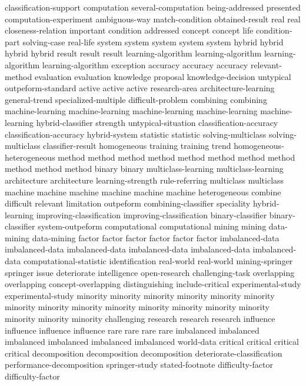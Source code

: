 classification-support	
computation	
several-computation	
being-addressed	
presented	
computation-experiment	
ambiguous-way	
match-condition	
obtained-result	
real	real	
closeness-relation	
important	
condition	
addressed	
concept	concept	
life	
condition-part	
solving-case	
real-life	
system	system	system	system	system	
hybrid	hybrid	hybrid	hybrid	
result	result	result	
learning-algorithm	learning-algorithm	learning-algorithm	learning-algorithm	
exception	
accuracy	accuracy	accuracy	
relevant-method	
evaluation	evaluation	
knowledge	
proposal	
knowledge-decision	
untypical	
outpeform-standard	
active	active	active	
research-area	
architecture-learning	
general-trend	
specialized-multiple	
difficult-problem	
combining	combining	
machine-learning	machine-learning	machine-learning	machine-learning	machine-learning	
hybrid-classifier	
strength	
untypical-situation	
classification-accuracy	classification-accuracy	
hybrid-system	
statistic	statistic	
solving-multiclass	solving-multiclass	
classifier-result	
homogeneous	
training	training	
trend	
homogeneous-heterogeneous	
method	method	method	method	method	method	method	method	method	method	method	
binary	binary	
multiclass-learning	multiclass-learning	
architecture	architecture	
learning-strength	
rule-referring	
multiclass	multiclass	
machine	machine	machine	machine	machine	machine	
heterogeneous	
combine	
difficult	
relevant	
limitation	
outpeform	
combining-classifier	
speciality	
hybrid-learning	
improving-classification	improving-classification	
binary-classifier	binary-classifier	
system-outpeform	
computational	computational	
mining	mining	
data-mining	data-mining	
factor	factor	factor	factor	factor	factor	
imbalanced-data	imbalanced-data	imbalanced-data	imbalanced-data	imbalanced-data	imbalanced-data	
computational-statistic	
identification	
real-world	real-world	
mining-springer	
springer	
issue	
deteriorate	
intelligence	
open-research	
challenging-task	
overlapping	overlapping	
concept-overlapping	
distinguishing	
include-critical	
experimental-study	experimental-study	
minority	minority	minority	minority	minority	minority	minority	minority	minority	minority	minority	minority	minority	minority	minority	minority	minority	
challenging	
research	research	research	
influence	influence	influence	influence	
rare	rare	rare	rare	
imbalanced	imbalanced	imbalanced	imbalanced	imbalanced	imbalanced	
world-data	
critical	critical	critical	critical	
decomposition	decomposition	decomposition	
deteriorate-classification	
performance-decomposition	
springer-study	
stated-footnote	
difficulty-factor	difficulty-factor	
